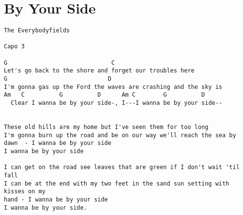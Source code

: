 \documentclass[leqno]{memoir}
\begin{document}
\chapter{By Your Side}
\begin{verbatim}
The Everybodyfields

Capo 3

G                              C
Let's go back to the shore and forget our troubles here
G                             D
I'm gonna gas up the Ford the waves are crashing and the sky is
Am   C          G          D      Am C        G          D
  Clear I wanna be by your side-, I---I wanna be by your side--


These old hills are my home but I've seen them for too long
I'm gonna burn up the road and be on our way we'll reach the sea by 
dawn  - I wanna be by your side
I wanna be by your side

I can get on the road see leaves that are green if I don't wait 'til fall
I can be at the end with my two feet in the sand sun setting with kisses on my
hand - I wanna be by your side
I wanna be by your side.

\end{verbatim}
\newpage
\end{document}
